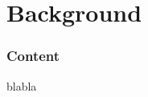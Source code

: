 \part{Background}
\nopagebreak
\section*{Content}
blabla \cite{einstein}
\afterpage{\blankpage}
\newpage

\newpage

\afterpage{\blankpage}
\newpage